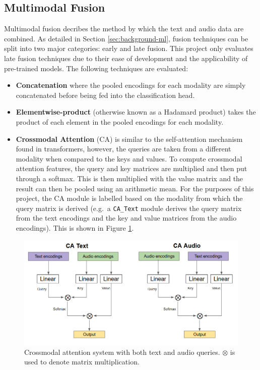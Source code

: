 \documentclass[twocolumn,twoside]{article}
\providecommand{\tightlist}{%
  \setlength{\itemsep}{0pt}\setlength{\parskip}{0pt}}
\begin{document}
\subsection{Multimodal Fusion}\label{sec:mm-fusion}

Multimodal fusion decribes the method by which the text and audio data
are combined. As detailed in Section \ref{sec:background-ml}, fusion
techniques can be split into two major categories: early and late
fusion. This project only evaluates late fusion techniques due to their
ease of development and the applicability of pre-trained models. The
following techniques are evaluated:

\begin{itemize}
\tightlist
\item
  \textbf{Concatenation} where the pooled encodings for each modality
  are simply concatenated before being fed into the classification head.
\item
  \textbf{Elementwise-product} (otherwise known as a Hadamard product)
  takes the product of each element in the pooled encodings for each
  modality.
\item
  \textbf{Crossmodal Attention} (CA) is similar to the self-attention
  mechanism found in transformers, however, the queries are taken from a
  different modality when compared to the keys and values. To compute
  crossmodal attention features, the query and key matrices are
  multiplied and then put through a softmax. This is then multiplied
  with the value matrix and the result can then be pooled using an
  arithmetic mean. For the purposes of this project, the CA module is
  labelled based on the modality from which the query matrix is derived
  (e.g.~a \texttt{CA\_Text} module derives the query matrix from the
  text encodings and the key and value matrices from the audio
  encodings). This is shown in Figure \ref{fig:crossmodal-attention}.
\end{itemize}

\begin{figure}[t!]
\centering
\includegraphics[width=16cm]{crossmodal-attention}
\caption{Crossmodal attention system with both text and audio queries. $\otimes$ is used to denote matrix multiplication.\label{fig:crossmodal-attention}}
\end{figure}
\end{document}
